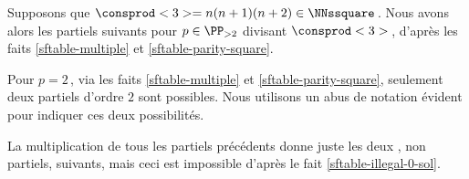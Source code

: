 Supposons que $\consprod<3> = n(n+1)(n+2) \in \NNssquare$\,. Nous avons alors les \sftab[x] partiels suivants pour $p \in \PP_{>2}$ divisant $\consprod<3>$\,, d'après les faits \ref{sftable-multiple} et \ref{sftable-parity-square}.

\begin{center}
\end{center}


Pour $p = 2$\,, via les faits \ref{sftable-multiple} et \ref{sftable-parity-square}, seulement deux \sftab[x] partiels d'ordre $2$ sont possibles. Nous utilisons un abus de notation évident pour indiquer ces deux possibilités.

\begin{center}
\end{center}


La multiplication de tous les \sftab[x] partiels précédents donne juste les deux \sftab[x], non partiels, suivants, mais ceci est impossible d'après le fait \ref{sftable-illegal-0-sol}.

\begin{center}
\end{center}
